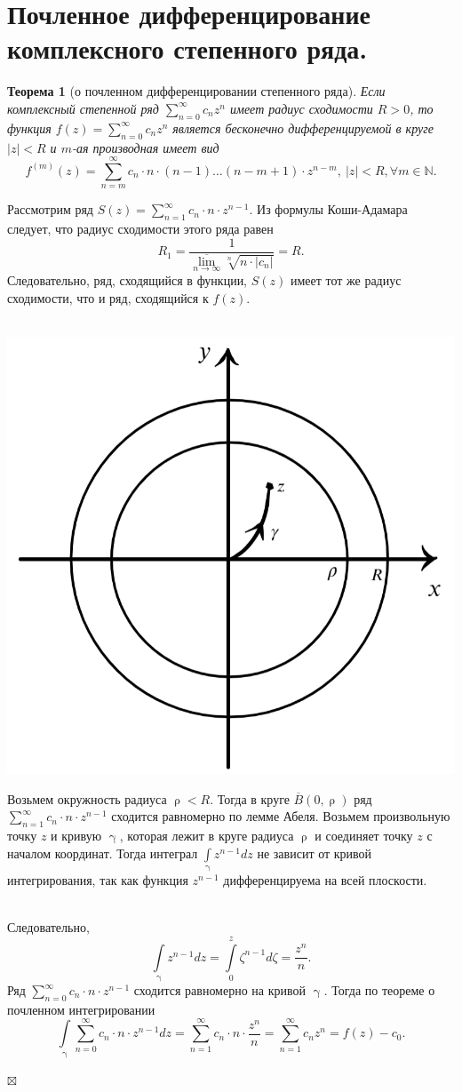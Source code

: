 \documentclass[a4paper, 12pt]{article}
\newenvironment{Proof} %
{\par\noindent{$\blacklozenge$}} %
{\hfill$\scriptstyle\boxtimes$}
\newcommand{\N}{\mathbb{N}}
\renewcommand{\gamma}{\upgamma}
\renewcommand{\rho}{\uprho}
\newcommand{\sumz}{\sum\limits_{n = 0}^\infty }
\newcommand{\sumo}{\sum\limits_{n = 1}^\infty }
\newtheorem*{theorem}{Теорема}
\begin{document}
\section{Почленное дифференцирование комплексного степенного ряда.}
\begin{theorem}
	[о почленном дифференцировании степенного ряда]
	Если комплексный степенной ряд $\sumz c_nz^n$ имеет радиус сходимости $R>0$, то функция $f(z) =  \sumz c_nz^n$ является бесконечно дифференцируемой в круге $|z| < R$ и $m$-ая производная имеет вид $$f^{(m)}(z) = \sum\limits^\infty_{n = m} c_n \cdot n\cdot (n-1) \dots (n-m+1)\cdot z^{n-m},\ |z| < R, \forall m \in \N.$$
\end{theorem}\begin{Proof}
Рассмотрим ряд $S(z) = \sum\limits_{n=1}^\infty c_n\cdot n \cdot z^{n-1}$. Из формулы Коши-Адамара следует, что радиус сходимости этого ряда равен $$R_1 =  \dfrac{1}{\overline{\lim\limits_{n \to \infty}} \sqrt[n]{n\cdot |c_n|}} = R.$$
Следовательно, ряд, сходящийся в функции, $S(z)$ имеет тот же радиус сходимости, что и ряд, сходящийся к $f(z)$.\\\\
\noindent
\parbox[b][5cm][t]{10mm}{
	\includegraphics[scale=0.4]{images/034.png}}
\hfill
\parbox[b][4.5cm][t]{110mm}{
Возьмем окружность радиуса $\rho < R$. Тогда в круге $\overline{B}(0,\rho)$ ряд $\sum\limits_{n=1}^\infty c_n\cdot n \cdot z^{n-1}$ сходится равномерно по лемме Абеля. Возьмем произвольную точку $z$ и кривую $\gamma$, которая лежит в круге радиуса $\rho$ и соединяет точку $z$ с началом координат. Тогда интеграл $\int\limits_\gamma z^{n-1}dz$ не зависит от кривой интегрирования, так как функция $z^{n-1}$ дифференцируема на всей плоскости.}\\  Следовательно, $$\int\limits_\gamma z^{n-1}dz = \int\limits_0^z \zeta ^{n-1}d\zeta = \dfrac{z^n}{n}.$$ Ряд $\sumz c_n\cdot n \cdot z^{n-1}$ сходится равномерно на кривой $\gamma$. Тогда по теореме о почленном интегрировании $$\int\limits_\gamma \sumz c_n\cdot n\cdot z^{n-1}dz = \sumo c_n\cdot n\cdot \dfrac{z^n}{n} = \sumo c_nz^n = f(z) - c_0.$$

\end{Proof}
\end{document}
